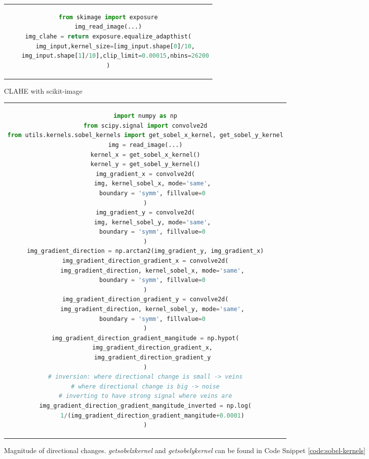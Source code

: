 \begin{figure}[htpb]
	\begin{tabular}{c}
	\begin{lstlisting}[language=Python]
from skimage import exposure
img_read_image(...)
img_clahe = return exposure.equalize_adapthist(
	img_input,kernel_size=[img_input.shape[0]/10,
	img_input.shape[1]/10],clip_limit=0.00015,nbins=26200
)
	\end{lstlisting}
	\end{tabular}
	\caption[Example listing]{CLAHE with scikit-image}
\label{code:clahe-scikit}
\end{figure}


\begin{figure}[htpb]
	\begin{tabular}{c}
	\begin{lstlisting}[language=Python]
import numpy as np
from scipy.signal import convolve2d
from utils.kernels.sobel_kernels import get_sobel_x_kernel, get_sobel_y_kernel
img = read_image(...)
kernel_x = get_sobel_x_kernel()
kernel_y = get_sobel_y_kernel()
img_gradient_x = convolve2d(
	img, kernel_sobel_x, mode='same',
	boundary = 'symm', fillvalue=0
)
img_gradient_y = convolve2d(
	img, kernel_sobel_y, mode='same',
	boundary = 'symm', fillvalue=0
)
img_gradient_direction = np.arctan2(img_gradient_y, img_gradient_x)
img_gradient_direction_gradient_x = convolve2d(
	img_gradient_direction, kernel_sobel_x, mode='same',
	boundary = 'symm', fillvalue=0
)
img_gradient_direction_gradient_y = convolve2d(
	img_gradient_direction, kernel_sobel_y, mode='same',
	boundary = 'symm', fillvalue=0
)
img_gradient_direction_gradient_mangitude = np.hypot(
	img_gradient_direction_gradient_x,
	img_gradient_direction_gradient_y
)
# inversion: where directional change is small -> veins
# where directional change is big -> noise
# inverting to have strong signal where veins are
img_gradient_direction_gradient_mangitude_inverted = np.log(
	1/(img_gradient_direction_gradient_mangitude+0.0001)
)
	\end{lstlisting}
	\end{tabular}
	\caption[Example listing]{Magnitude of directional changes. \emph{get\textunderscore sobel\textunderscore x\textunderscore kernel} and \emph{get\textunderscore sobel\textunderscore y\textunderscore kernel} can be found in Code Snippet \ref{code:sobel-kernels}}
\label{code:smart-sobel}
\end{figure}

